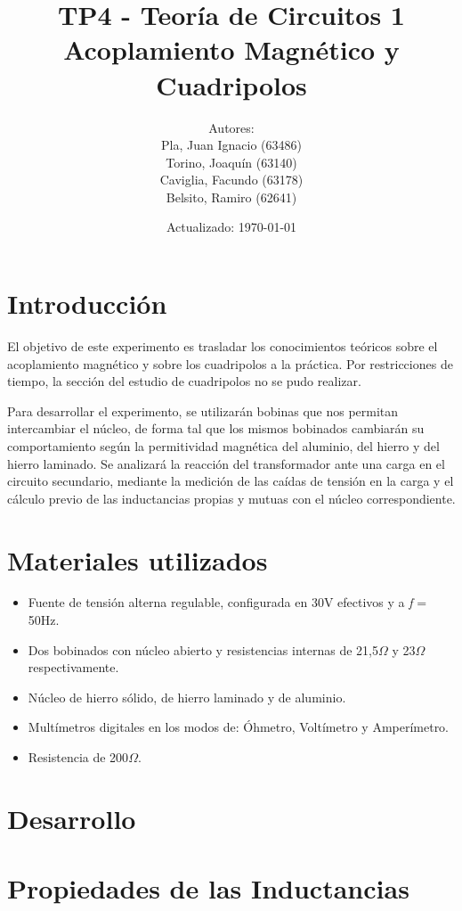 \documentclass[a4paper,12pt]{article}
\title{TP4 - Teoría de Circuitos 1\\ Acoplamiento Magnético y Cuadripolos}
\author{Autores: \\Pla, Juan Ignacio (63486)\\Torino, Joaquín (63140)\\Caviglia, Facundo (63178)\\Belsito, Ramiro (62641)}
\date{Actualizado: \today}
\begin{document}
\maketitle

\section{Introducción}
\hspace{1cm} El objetivo de este experimento es trasladar los conocimientos teóricos sobre 
el acoplamiento magnético y sobre los cuadripolos a la práctica. Por restricciones de tiempo,
la sección del estudio de cuadripolos no se pudo realizar.

\hspace{1cm} Para desarrollar el experimento, se utilizarán bobinas que nos permitan intercambiar
el núcleo, de forma tal que los mismos bobinados cambiarán su comportamiento según la 
permitividad magnética del aluminio, del hierro y del hierro laminado. Se analizará la reacción
del transformador ante una carga en el circuito secundario, mediante la medición de las caídas de
tensión en la carga y el cálculo previo de las inductancias propias y mutuas con el núcleo correspondiente.


\section{Materiales utilizados}

\begin{itemize}
\item Fuente de tensión alterna regulable, configurada en 30V efectivos y a \textit{f} = 50Hz.
\item Dos bobinados con núcleo abierto y resistencias internas de 21,5$\Omega$ y 23$\Omega$ 
respectivamente.
\item Núcleo de hierro sólido, de hierro laminado y de aluminio.
\item Multímetros digitales en los modos de: Óhmetro, Voltímetro y Amperímetro.
\item Resistencia de 200$\Omega$.
\end{itemize}

\section{Desarrollo}

\hspace{1cm} 

\section{Propiedades de las Inductancias}
\end{document}
